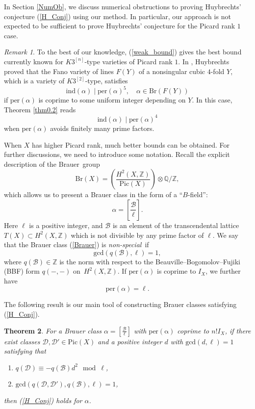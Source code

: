 \documentclass[11pt]{amsart}
\theoremstyle{plain}
\newtheorem{thm}{Theorem}[section]
\theoremstyle{definition}
\theoremstyle{remark}
\newtheorem{rmk}[thm]{Remark}
\newcommand{\BQ}{{\mathbb{Q}}}
\newcommand{\BZ}{{\mathbb{Z}}}
\newcommand{\CB}{{\mathcal B}}
\newcommand{\CD}{{\mathcal D}}
\begin{document}
In Section \ref{NumOb}, we discuss numerical obstructions to proving Huybrechts' conjecture (\ref{H_Conj}) using our method. In particular, our approach is not expected to be sufficient to prove Huybrechts' conjecture for the Picard rank $1$ case.


\begin{rmk}
To the best of our knowledge, (\ref{weak_bound}) gives the best bound currently known for $K3^{[n]}$-type varieties of Picard rank $1$. In \cite[Section 2.6]{H_PI}, Huybrechts proved that the Fano variety of lines $F(Y)$ of a nonsingular cubic $4$-fold $Y$, which is a variety of $K3^{[2]}$-type, satisfies
\[
\mathrm{ind}(\alpha) \mid \mathrm{per}(\alpha)^5, \quad \alpha \in \mathrm{Br}(F(Y))
\]
if $\mathrm{per}(\alpha)$ is coprime to some uniform integer depending on $Y$. In this case, Theorem \ref{thm0.2} reads 
\[
\mathrm{ind}(\alpha) \mid \mathrm{per}(\alpha)^4
\]
when $\mathrm{per}(\alpha)$ avoids finitely many prime factors.
\end{rmk}



When $X$ has higher Picard rank, much better bounds can be obtained. For further discussions, we need to introduce some notation. Recall the explicit description of the Brauer~group
\begin{equation*}
\mathrm{Br}(X) = \left( \frac{H^2(X, \BZ)} {\mathrm{Pic}(X)}\right) \otimes \BQ/\BZ,
\end{equation*}
which allows us to present a Brauer class in the form of a ``$B$-field'':
\begin{equation}\label{Brauer}
\alpha = \left[ \frac{\CB}{\ell}\right].
\end{equation}
Here $\ell$ is a positive integer, and $\CB$ is an element of the transcendental lattice $T(X) \subset H^2(X, \BZ)$ which is not divisible by any prime factor of $\ell$. We say that the Brauer class (\ref{Brauer}) is \emph{non-special}~if 
\[
\mathrm{gcd}(q(\CB), \ell) =1,
\]
where $q(\CB) \in \BZ$ is the norm with respect to the Beauville--Bogomolov--Fujiki (BBF) form $q(-, -)$ on~$H^2(X, \BZ)$.  If $\mathrm{per}(\alpha)$ is coprime to $I_X$, we further have
\[
\mathrm{per}(\alpha) =\ell.
\]


The following result is our main tool of constructing Brauer classes satisfying (\ref{H_Conj}).

\begin{thm}\label{thm0.4}
For a Brauer class $\alpha = \left[\frac{\CB}{\ell} \right]$ with $\mathrm{per(\alpha)}$ coprime to $n!I_X$, if there exist classes $\CD, \CD' \in \mathrm{Pic}(X)$ and a positive integer $d$ with $\mathrm{gcd}(d,\ell)=1$ satisfying that
\begin{enumerate}
    \item[(i)] $q(\CD) \equiv -q(\CB)d^2 \mod \ell$,
    \item[(ii)] $\mathrm{gcd}\left(q(\CD,\CD'), q(\CB), \ell \right)=1$,
\end{enumerate}
then (\ref{H_Conj}) holds for $\alpha$.
\end{thm}
\end{document}
